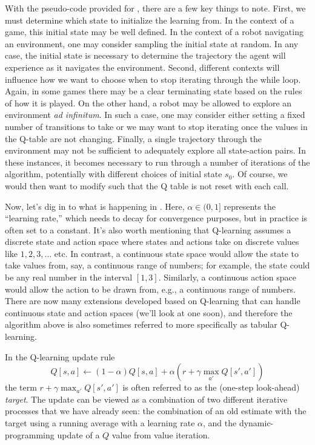 With the pseudo-code provided for , there are a few
key things to note. First, we must determine which state to initialize the
learning from. In the context of a game, this initial state may be well defined.
In the context of a robot navigating an environment, one may consider
sampling the initial state at random. In any case, the initial state is necessary
to determine the trajectory the agent will experience as it navigates the environment.
Second, different contexts will influence how we want to choose when to stop
iterating through the while loop. Again, in some games there may be a clear
terminating state based on the rules of how it is played. On the other hand,
a robot may be allowed to explore an environment \emph{ad infinitum}.
In such a case, one may consider either setting a fixed number of transitions to take
or we may want to stop iterating once the values in the Q-table are not changing.
Finally, a single trajectory through the environment may not be sufficient to adequately
explore all state-action pairs. In these instances, it becomes necessary to run
through a number of iterations of the  algorithm, potentially
with different choices of initial state $s_0$. Of course, we would then want to modify  such
that the Q table is not reset with each call.

Now, let's dig in to what is happening in .
Here, $\alpha\in (0,1]$ represents the ``learning rate,'' which needs to decay
for convergence purposes, but in practice is often set to a
constant. It's also worth mentioning that Q-learning assumes a
discrete state and action space where states and actions take on
discrete values like $1,2,3,\dots$ etc. In contrast, a continuous
state space would allow the state to take values from, say, a
continuous range of numbers; for example, the state could be any real
number in the interval $[1,3]$. Similarly, a continuous action space
would allow the action to be drawn from, e.g., a continuous range of
numbers. There are now many extensions developed based on Q-learning
that can handle continuous state and action spaces (we'll look at one
soon), and therefore the algorithm above is also sometimes referred to
more  specifically as tabular Q-learning.

In the Q-learning update rule
\begin{equation}\label{q_avg}
  Q[s, a] \leftarrow (1-\alpha)Q[s, a]
  + \alpha(r + \gamma \max_{a'}Q[s',a'])
\end{equation}
the term $r + \gamma \max_{a'} Q[s',a']$ is often referred to as the
(one-step look-ahead) \emph{target}. The update can be viewed as a
combination of two different iterative processes that we have already
seen: the combination of an old estimate with the target using a
running average with a learning rate $\alpha$, and the
dynamic-programming update of a $Q$ value from value iteration.


